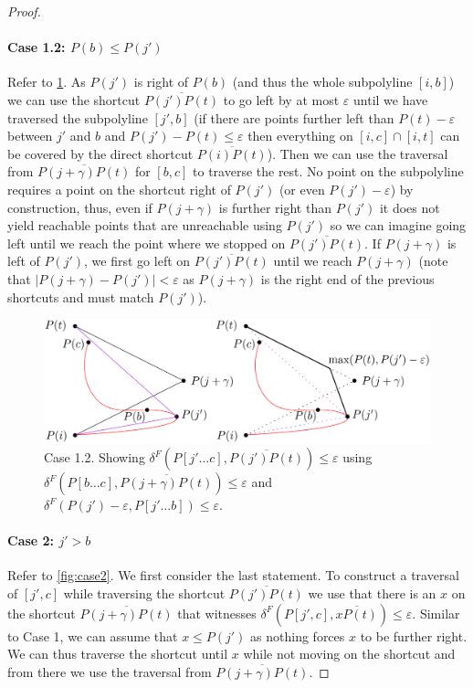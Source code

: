 \begin{proof}
	\paragraph{Case 1.2: \(P(b) \leq P(j')\)} 
	Refer to \cref{fig:case12}. As \(P(j')\) is right of \(P(b)\) (and thus the whole subpolyline \([i, b]\)) we can use the shortcut \(\overline{P(j')P(t)}\) to go left by at most \(\varepsilon\) until we have traversed the subpolyline \([j', b]\) (if there are points further left than \(P(t)-\varepsilon\) between \(j'\) and \(b\) and \(P(j')-P(t) \leq \varepsilon\) then everything on \([i, c] \cap [i, t]\) can be covered by the direct shortcut \(\overline{P(i)P(t)}\)). Then we can use the traversal from \(\overline{P(j+\gamma)P(t)}\) for \([b, c]\) to traverse the rest. No point on the subpolyline requires a point on the shortcut right of \(P(j')\) (or even \(P(j') - \varepsilon\)) by construction, thus, even if \(P(j + \gamma)\) is further right than \(P(j')\) it does not yield reachable points that are unreachable using \(P(j')\) so we can imagine going left until we reach the point where we stopped on \(\overline{P(j')P(t)}\). If \(P(j+\gamma)\) is left of \(P(j')\), we first go left on \(\overline{P(j')P(t)}\) until we reach \(P(j+\gamma)\) (note that \(|P(j+\gamma) - P(j')| < \varepsilon\) as \(P(j+\gamma)\) is the right end of the previous shortcuts and must match \(P(j')\)).

	\begin{figure}[b]
		\centering
		\includegraphics[scale=0.15]{./figures/case1-2.png}
		\caption{Case 1.2. Showing \(\delta^F(P[j' \dots c], \overline{P(j')P(t)}) \leq \varepsilon\) using \(\delta^F(P[b \dots c], \overline{P(j+\gamma)P(t)}) \leq \varepsilon\) and \(\delta^F(P(j') - \varepsilon, P[j' \dots b]) \leq \varepsilon\).}
		\label{fig:case12}
	\end{figure}

	\paragraph{Case 2: \(j' > b\)}
	Refer to \cref{fig:case2}. We first consider the last statement. To construct a traversal of \([j', c]\) while traversing the shortcut \(\overline{P(j')P(t)}\) we use that there is an \(x\) on the shortcut \(\overline{P(j+\gamma)P(t)}\) that witnesses \(\delta^F(P[j', c], \overline{xP(t)}) \leq \varepsilon\). Similar to Case 1, we can assume that \(x \leq P(j')\) as nothing forces \(x\) to be further right. We can thus traverse the shortcut until \(x\) while not moving on the shortcut and from there we use the traversal from \(\overline{P(j+\gamma)P(t)}\).


\end{proof}
